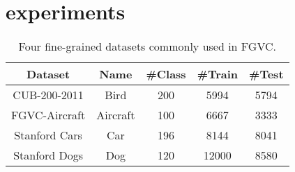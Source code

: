 \documentclass[conference]{IEEEtran}
\begin{document}
	\section{experiments}
	\begin{table}[t]
		\caption{Four fine-grained datasets commonly used in FGVC.}
		\label{table:dataset}
		\centering
		\begin{tabular}{ccccc}
			\hline
			Dataset       & Name     & \#Class & \#Train & \#Test \\ \hline
			CUB-200-2011  & Bird     & 200     & 5994   & 5794 \\
			FGVC-Aircraft & Aircraft & 100     & 6667   & 3333 \\
			Stanford Cars & Car      & 196     & 8144   & 8041 \\
			Stanford Dogs & Dog      & 120     & 12000  & 8580  \\ \hline
		\end{tabular}
	\end{table}
\end{document}
